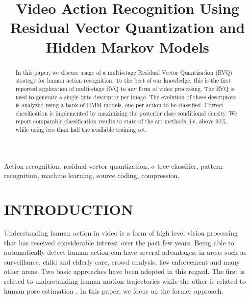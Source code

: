 \documentclass{article}
\title{Video Action Recognition Using Residual Vector Quantization and Hidden Markov Models}
\begin{document}
\maketitle


\begin{abstract}
In this paper, we discuss usage of a multi-stage Residual Vector Quantization (RVQ) strategy for human action recognition.  To the best of our knowledge, this is the first reported application of multi-stage RVQ to any form of video processing.  The RVQ is used to generate a single byte descriptor per image.  The evolution of these descriptors is analyzed using a bank of HMM models, one per action to be classified.  Correct classification is implemented by maximizing the posterior class conditional density.  We report comparable classification results to state of the art methods, i.e. above 90\%,  while using less than half the available training set.  
\end{abstract}

\begin{keywords}
Action recognition, residual vector quantization, $\sigma$-tree classifier, pattern recognition, machine learning, source coding, compression.
\end{keywords}


\section{INTRODUCTION}
Understanding human action in video is a form of high level vision processing that has received considerable interest over the past few years.  Being able to automatically detect human action can have several advantages, in areas such as surveillance, child and elderly care, crowd analysis, law enforcement and many other areas. Two basic approaches have been adopted in this regard.  The first is related to understanding human motion trajectories \cite{2001_JNL_MotionTemplates_Bobick} \cite{2007_JNL_SpaceTimeShapes_Gorelick} \cite{2010_JNL_ActionReconKinematic_Ali} while the other is related to human pose estimation \cite{2004_CNF_TrackingLooseLimbedPeople_Sigal}.  In this paper, we focus on the former approach.
\end{document}
